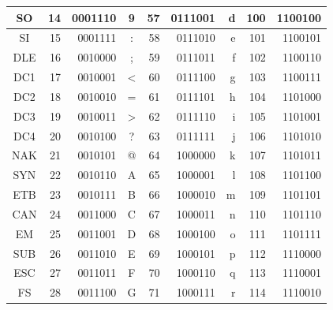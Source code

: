 \begin{table}[!htbp]
\begin{tabular}{|c|r|r||c|r|r||r|r|r|}
SO      & 14      	& 0001110          & 9       & 57      	& 0111001          & d                & 100     	& 1100100          \\ \hline
SI      & 15      	& 0001111          & :       & 58      	& 0111010          & e                & 101     	& 1100101          \\ \hline
DLE     & 16      & 0010000         & ;       & 59      	& 0111011          & f                & 102     	& 1100110          \\ \hline
DC1     & 17      & 0010001          & <       & 60      	& 0111100          & g                & 103     	& 1100111          \\ \hline
DC2     & 18      & 0010010          & =       & 61      	& 0111101          & h                & 104     	& 1101000         \\ \hline
DC3     & 19      & 0010011          & >       & 62      	& 0111110          & i                & 105     	& 1101001          \\ \hline
DC4     & 20      & 0010100         & ?       & 63      	& 0111111          & j                & 106     	& 1101010          \\ \hline
NAK     & 21     	& 0010101          & @       & 64      	& 1000000          & k                & 107     	& 1101011         \\ \hline
SYN     & 22     	& 0010110         & A       & 65      	& 1000001          & l                & 108     	& 1101100         \\ \hline
ETB     & 23      & 0010111          & B       & 66      	& 1000010          & m                & 109    	& 1101101         \\ \hline
CAN     & 24     & 0011000         & C       & 67      	& 1000011          & n                & 110     	& 1101110          \\ \hline
EM      & 25      	& 0011001         & D       & 68      	& 1000100          & o                & 111     	& 1101111          \\ \hline
SUB     & 26     	& 0011010         & E       & 69      	& 1000101          & p                & 112     	& 1110000          \\ \hline
ESC     & 27    	& 0011011         & F       & 70      	& 1000110          & q                & 113     	& 1110001          \\ \hline
FS      & 28      	& 0011100          & G       & 71      	& 1000111          & r                & 114     	& 1110010          \\ \hline

\end{tabular}
\end{table}
